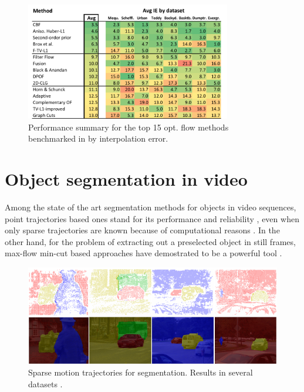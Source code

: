    \begin{figure}[thpb]
      \centering
      \includegraphics[width=0.8\textwidth]{../images/of_performance.png}
      \caption{ Performance summary for the top 15 opt. flow methods benchmarked in \cite{c17} by interpolation error. }
      \label{of_per}
   \end{figure}

\section{Object segmentation in video}

Among the state of the art segmentation methods for objects in video
sequences, point trajectories based ones stand for its performance and 
reliability \cite{c33}, even when only sparse trajectories are known because of
computational reasons \cite{c34}. In the other hand, for the problem of extracting out a 
preselected object in still frames, max-flow min-cut based approaches 
have demostrated to be a powerful tool \cite{c14}\cite{c18}. 

   \begin{figure}[bhp]
      \centering
      \includegraphics[height=0.275\textheight]{../images/point_traj_segm.png}
      \caption{  Sparse motion trajectories for segmentation. Results in several datasets  \cite{c34}. }
      \label{pt_seg}
   \end{figure}


